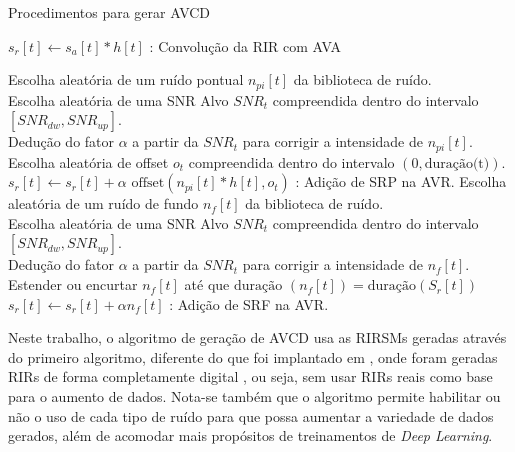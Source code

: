 \begin{algorithm} [H] 
    \caption{Procedimentos para gerar AVCD}
    \label{alg:AVCD-gen}


    $s_r[t] \gets s_a[t] \ast h[t]$ : Convolução da RIR com AVA

    {
        {
            Escolha aleatória de um ruído pontual $n_{pi}[t]$ da biblioteca de ruído. \\
            Escolha aleatória de uma SNR Alvo $SNR_t$ compreendida dentro do intervalo $[SNR_{dw},SNR_{up}]$. \\
            Dedução do fator $\alpha$ a partir da $SNR_t$ para corrigir a intensidade de $n_{pi}[t]$. \\
            Escolha aleatória de offset $o_t$ compreendida dentro do intervalo $(0,\text{duração(t)})$. \\
            $s_r[t] \gets s_r[t] + \alpha \text{ offset}(n_{pi}[t] \ast h[t], o_t)$ : Adição de SRP na AVR.
        }
    }
    {
        Escolha aleatória de um ruído de fundo $n_f[t]$ da biblioteca de ruído. \\
        Escolha aleatória de uma SNR Alvo $SNR_t$ compreendida dentro do intervalo $[SNR_{dw},SNR_{up}]$. \\
        Dedução do fator $\alpha$ a partir da $SNR_t$ para corrigir a intensidade de $n_f[t]$. \\
        Estender ou encurtar $n_f[t]$ até que $\text{duração }(n_f[t]) = \text{duração}(S_r[t])$
        $s_r[t] \gets s_r[t] + \alpha n_f[t]$ : Adição de SRF na AVR.
    }

\end{algorithm}
\pagebreak


Neste trabalho, o algoritmo de geração de AVCD usa as RIRSMs geradas através do primeiro algoritmo, diferente do que foi implantado
em \cite{Speech_Rec}, onde foram geradas RIRs de forma completamente digital \cite{RIR_sim_image}, ou seja, sem usar RIRs reais 
como base para o aumento de dados.
Nota-se também que o algoritmo permite habilitar ou não o uso de cada tipo de ruído para que possa aumentar a variedade de dados gerados, além
de acomodar mais propósitos de treinamentos de \textit{Deep Learning}.

